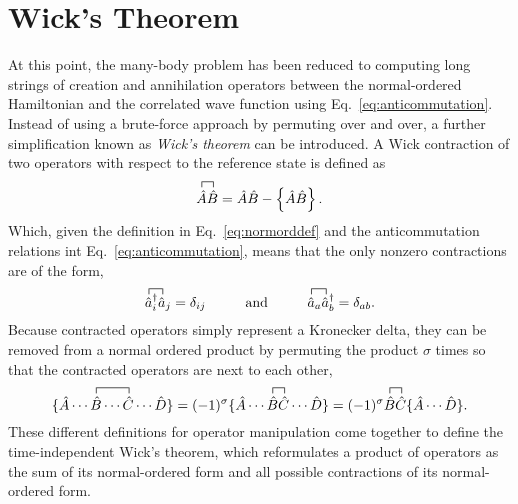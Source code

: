 \documentclass[thesis.tex]{subfiles}
\begin{document}
\section{Wick's Theorem}
At this point, the many-body problem has been reduced to computing long strings of creation and annihilation operators between the normal-ordered Hamiltonian and the correlated wave function using Eq.\ \eqref{eq:anticommutation}.  Instead of using a brute-force approach by permuting over and over, a further simplification known as \textit{Wick's theorem} \cite{WICK1950} can be introduced.  A Wick contraction of two operators with respect to the reference state is defined as
\begin{equation} \label{eq:wick1}
  \contraction[1.0ex]{}{\hat{A}}{}{\hat{B}}
  \hat{A}\hat{B} = \hat{A}\hat{B} - \normord{\hat{A}\hat{B}}.
\end{equation}
Which, given the definition in Eq.\ \eqref{eq:normorddef} and the anticommutation relations int Eq.\ \eqref{eq:anticommutation}, means that the only nonzero contractions are of the form,
\begin{equation} \label{eq:wick2}
  \contraction[1.0ex]{}{\hat{a}}{^{\dagger}_{i}}{\hat{a}}
  \hat{a}^{\dagger}_{i}\hat{a}_{j} = \delta_{ij} \hspace{1.0cm} \text{and} \hspace{1.0cm}
  \contraction[1.0ex]{}{\hat{a}}{_{a}}{\hat{a}}
  \hat{a}_{a}\hat{a}_{b}^{\dagger} = \delta_{ab}.
\end{equation}
Because contracted operators simply represent a Kronecker delta, they can be removed from a normal ordered product by permuting the product $\sigma$ times so that the contracted operators are next to each other,
\begin{equation} \label{eq:wick3}
  \contraction[1.0ex]{\{ \hat{A}\cdots}{\hat{B}}{\cdots}{\hat{C}}
  \{ \hat{A}\cdots\hat{B}\cdots\hat{C}\cdots\hat{D} \} = (-1)^{\sigma}
  \contraction[1.0ex]{\{ \hat{A}\cdots}{\hat{B}}{}{\hat{C}}
  \{ \hat{A}\cdots\hat{B}\hat{C}\cdots\hat{D} \} = (-1)^{\sigma}
  \contraction[1.0ex]{}{\hat{B}}{}{\hat{C}}
  \hat{B}\hat{C}\{ \hat{A}\cdots\hat{D} \}.
\end{equation}
These different definitions for operator manipulation come together to define the time-independent Wick's theorem, which reformulates a product of operators as the sum of its normal-ordered form and all possible contractions of its normal-ordered form.
\end{document}

